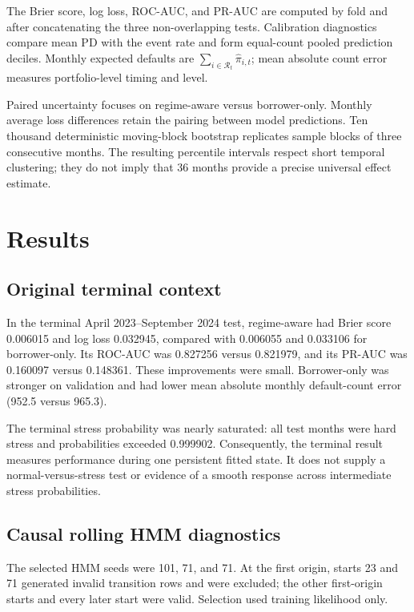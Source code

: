 \documentclass[12pt]{article}
\begin{document}
The Brier score, log loss, ROC-AUC, and PR-AUC are computed by fold and after concatenating the three non-overlapping tests. Calibration diagnostics compare mean PD with the event rate and form equal-count pooled prediction deciles. Monthly expected defaults are $\sum_{i\in\mathcal{R}_t}\widehat\pi_{i,t}$; mean absolute count error measures portfolio-level timing and level.

Paired uncertainty focuses on regime-aware versus borrower-only. Monthly average loss differences retain the pairing between model predictions. Ten thousand deterministic moving-block bootstrap replicates sample blocks of three consecutive months. The resulting percentile intervals respect short temporal clustering; they do not imply that 36 months provide a precise universal effect estimate.

\section{Results}

\subsection{Original terminal context}

In the terminal April 2023--September 2024 test, regime-aware had Brier score 0.006015 and log loss 0.032945, compared with 0.006055 and 0.033106 for borrower-only. Its ROC-AUC was 0.827256 versus 0.821979, and its PR-AUC was 0.160097 versus 0.148361. These improvements were small. Borrower-only was stronger on validation and had lower mean absolute monthly default-count error (952.5 versus 965.3).

The terminal stress probability was nearly saturated: all test months were hard stress and probabilities exceeded 0.999902. Consequently, the terminal result measures performance during one persistent fitted state. It does not supply a normal-versus-stress test or evidence of a smooth response across intermediate stress probabilities.

\subsection{Causal rolling HMM diagnostics}

The selected HMM seeds were 101, 71, and 71. At the first origin, starts 23 and 71 generated invalid transition rows and were excluded; the other first-origin starts and every later start were valid. Selection used training likelihood only.
\end{document}
